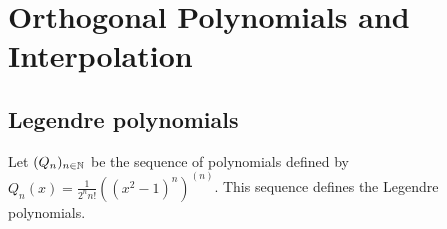 \chapter{Orthogonal Polynomials and Interpolation}

\section{Legendre polynomials}
Let \((Q_n)_{n\in\mathbb{N}}\) be the sequence of polynomials defined by \(Q_n(x) = \frac{1}{2^n n!} \left((x^2-1)^n\right)^{(n)} \).
This sequence defines the Legendre polynomials.
